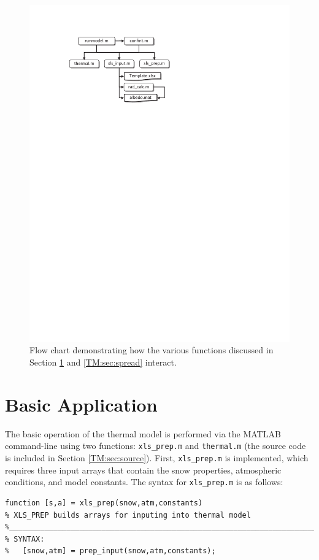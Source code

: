 \begin{figure}[ht!]\centering
\includegraphics{figures/flow.pdf}
\caption{Flow chart demonstrating how the various functions discussed in Section \ref{TM:sec:basic} and \ref{TM:sec:spread} interact.}
\label{TM:fig:flow}
\end{figure}

\section{Basic Application}\label{TM:sec:basic}
The basic operation of the thermal model is performed via the MATLAB command-line using two functions: \texttt{xls\_prep.m} and \texttt{thermal.m} (the source code is included in Section \ref{TM:sec:source}). First, \texttt{xls\_prep.m} is implemented, which requires three input arrays that contain the snow properties, atmospheric conditions, and model constants.  The syntax for \texttt{xls\_prep.m} is as follows:

\begin{singlespaced}\begin{lstlisting}[style=inline]
function [s,a] = xls_prep(snow,atm,constants)
% XLS_PREP builds arrays for inputing into thermal model
%__________________________________________________________________________
% SYNTAX:
%   [snow,atm] = prep_input(snow,atm,constants);
\end{lstlisting}\end{singlespaced}

